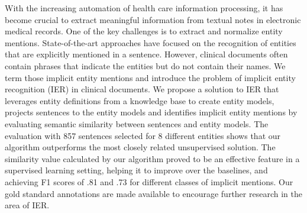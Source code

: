 With the increasing automation of health care information processing, it has become crucial to extract meaningful information from textual notes in electronic medical records. One of the key challenges is to extract and normalize entity mentions. State-of-the-art approaches have focused on the recognition of entities that are explicitly mentioned in a sentence. However, clinical documents often contain phrases that indicate the entities but do not contain their names. We term those implicit entity mentions and introduce the problem of implicit entity recognition (IER) in clinical documents. We propose a solution to IER that leverages entity definitions from a knowledge base to create entity models, projects sentences to the entity models and identifies implicit entity mentions by evaluating semantic similarity between sentences and entity models. The evaluation with 857 sentences selected for 8 different entities shows that our algorithm outperforms the most closely related unsupervised solution. The similarity value calculated by our algorithm proved to be an effective feature in a supervised learning setting, helping it to improve over the baselines, and achieving F1 scores of .81 and .73 for different classes of implicit mentions. Our gold standard annotations are made available to encourage further research in the area of IER.
